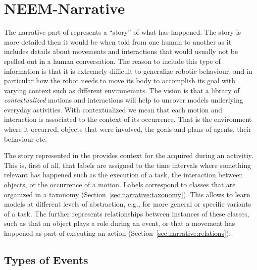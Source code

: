 
\chapter{NEEM-Narrative}
\label{ch:narrative}

The narrative part of \neems represents a ``story'' of what has happened.
The story is more detailed then it would be when told from one human to another
as it includes details about movements and interactions that would usually not be spelled out in a human conversation.
The reason to include this type of information is that it is extremely difficult to generalize robotic behaviour, and in particular how the robot needs to move its body to accomplish its goal with varying context such as different environemnts.
The vision is that a library of \emph{contextualized} motions and interactions will help to uncover models underlying everyday activities.
With contextualized we mean that each motion and interaction is associated to the context of its occurrence.
That is the environment where it occurred, objects that were involved, the goals and plans of agents, their behaviour etc.

The story represented in the \neemnar provides context for the \neemexp acquired during an activitiy.
This is, first of all, that labels are assigned to the time intervals where something relevant has happened such as the execution of a task, the interaction between objects, or the occurrence of a motion.
Labels correspond to classes that are organized in a taxonomy (Section~\ref{sec:narrative:taxonomy}).
This allows to learn models at different levels of abstraction, 
e.g., for more general or specific variants of a task.
The \neemnar further represents relationships between instances of these classes, such as that an object plays a role during an event, or that a movement has happened as part of executing an action
(Section~\ref{sec:narrative:relations}).

\section{Types of Events}
\label{sec:narrative:events}

